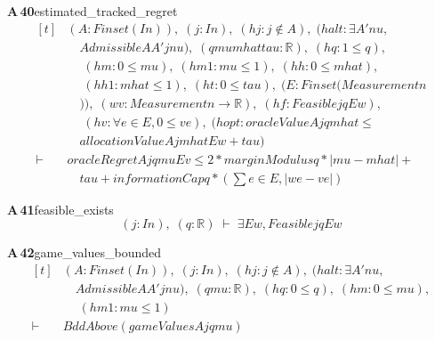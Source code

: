 \documentclass[conference]{IEEEtran}
\theoremstyle{definition}
\newcommand{\lean}[1]{\textsf{\footnotesize #1}}
\begin{document}
\noindent\textbf{A\,40}\quad\lean{estimated\_tracked\_regret}
{\footnotesize\[ \begin{aligned}[t]
&(\mathit{A} : \mathit{Finset} (\mathit{I} \mathit{n})),\; (\mathit{j} : \mathit{I} \mathit{n}),\; (\mathit{hj} : \mathit{j} \notin \mathit{A}),\; (\mathit{halt} : \exists \mathit{A'} \mathit{nu},\\
&\quad \mathit{Admissible} \mathit{A} \mathit{A'} \mathit{j} \mathit{nu}),\; (\mathit{q} \mathit{mu} \mathit{mhat} \mathit{tau} : \mathbb{R} ),\; (\mathit{hq} : 1 \leq \mathit{q}),\\
&\quad \; (\mathit{hm} : 0 \leq \mathit{mu}),\; (\mathit{hm1} : \mathit{mu} \leq 1),\; (\mathit{hh} : 0 \leq \mathit{mhat}),\\
&\quad \; (\mathit{hh1} : \mathit{mhat} \leq 1),\; (\mathit{ht} : 0 \leq \mathit{tau}),\; (\mathit{E} : \mathit{Finset} (\mathit{Measurement} \mathit{n}\\
&\quad )),\; (\mathit{w} \mathit{v} : \mathit{Measurement} \mathit{n} \to \mathbb{R} ),\; (\mathit{hf} : \mathit{Feasible} \mathit{j} \mathit{q} \mathit{E} \mathit{w}),\\
&\quad \; (\mathit{hv} : \forall \mathit{e} \in \mathit{E},0 \leq \mathit{v} \mathit{e}),\; (\mathit{hopt} : \mathit{oracleValue} \mathit{A} \mathit{j} \mathit{q} \mathit{mhat} \leq\\
&\quad \mathit{allocationValue} \mathit{A} \mathit{j} \mathit{mhat} \mathit{E} \mathit{w}+\mathit{tau})\\
\vdash\;&\mathit{oracleRegret} \mathit{A} \mathit{j} \mathit{q} \mathit{mu} \mathit{E} \mathit{v} \leq 2*\mathit{marginModulus} \mathit{q}*|\mathit{mu}-\mathit{mhat}|+\\
&\quad \mathit{tau}+ \mathit{informationCap} \mathit{q}*(\textstyle\sum \mathit{e} \in \mathit{E},|\mathit{w} \mathit{e}-\mathit{v} \mathit{e}|)
\end{aligned} \]}

\noindent\textbf{A\,41}\quad\lean{feasible\_exists}
{\footnotesize\[ (\mathit{j} : \mathit{I} \mathit{n}),\; (\mathit{q} : \mathbb{R} ) \;\vdash\; \exists \mathit{E} \mathit{w}, \mathit{Feasible} \mathit{j} \mathit{q} \mathit{E} \mathit{w} \]}

\noindent\textbf{A\,42}\quad\lean{game\_values\_bounded}
{\footnotesize\[ \begin{aligned}[t]
&(\mathit{A} : \mathit{Finset} (\mathit{I} \mathit{n})),\; (\mathit{j} : \mathit{I} \mathit{n}),\; (\mathit{hj} : \mathit{j} \notin \mathit{A}),\; (\mathit{halt} : \exists \mathit{A'} \mathit{nu},\\
&\quad \mathit{Admissible} \mathit{A} \mathit{A'} \mathit{j} \mathit{nu}),\; (\mathit{q} \mathit{mu} : \mathbb{R} ),\; (\mathit{hq} : 0 \leq \mathit{q}),\; (\mathit{hm} : 0 \leq \mathit{mu}),\\
&\quad \; (\mathit{hm1} : \mathit{mu} \leq 1)\\
\vdash\;&\mathit{BddAbove} (\mathit{gameValues} \mathit{A} \mathit{j} \mathit{q} \mathit{mu})
\end{aligned} \]}
\end{document}

